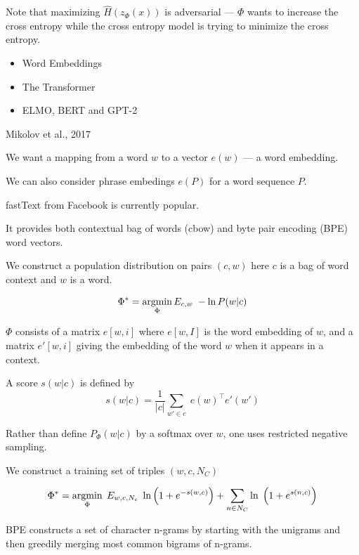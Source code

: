 {\vfill
Note that maximizing $\hat{H}(z_\Phi(x))$ is adversarial --- $\Phi$ wants to increase the cross entropy while the cross entropy model
is trying to minimize the cross entropy.


\begin{itemize}
\item Word Embeddings

\vfill
\item The Transformer

\vfill
\item ELMO, BERT and GPT-2
\end{itemize}

{Mikolov et al., 2017}

We want a mapping from a word $w$ to a vector $e(w)$ --- a word embedding.

\vfill
We can also consider phrase embedings $e(P)$ for a word sequence $P$.

\vfill
{\color{red} fastText} from Facebook is currently popular.

\vfill
It provides both contextual bag of words (cbow) and byte pair encoding (BPE) word vectors.


We construct a population distribution on pairs $(c,w)$ here $c$ is a bag of word context and $w$ is a word.

\vfill
$$\Phi^* = \operatorname*{argmin}_\Phi E_{c,w}\;-\ln P(w|c)$$

\vfill
$\Phi$ consists of a matrix $e[w,i]$ where $e[w,I]$ is the word embedding of $w$, and a matrix $e'[w,i]$ giving the embedding of the word
$w$ when it appears in a context.

\vfill
A score $s(w|c)$ is defined by
$$s(w|c) = \frac{1}{|c|} \sum_{w' \in c}\;e(w)^\top e'(w')$$


\vfill
Rather than define $P_\Phi(w|c)$ by a softmax over $w$, one uses restricted negative sampling.

\vfill
We construct a training set of triples $(w,c,N_C)$

\vfill
$$\Phi^* = \operatorname*{argmin}_\Phi\;E_{w,c,N_c}\;\ln\left(1 + e^{-s(w,c)}\right) + \sum_{n \in N_C} \ln\;\left(1 + e^{s(n,c)}\right)$$


BPE constructs a set of character n-grams by starting with the unigrams and then greedily merging most common bigrams of n-grams.

}

